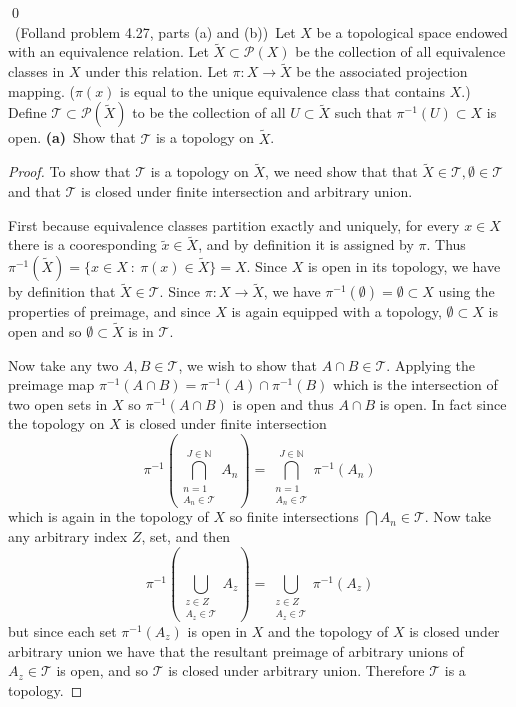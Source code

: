 \documentclass[11pt]{amsart}
\theoremstyle{definition}
\numberwithin{theorem}{section}
\numberwithin{definition}{section}
\numberwithin{equation}{section}
\def\scriptt{{\mathcal T}}
\def\scriptp{{\mathcal P}}
\begin{document}
\qed\\
\medskip {}\ (Folland problem 4.27, parts (a) and (b))\ 
Let $X$ be a topological space endowed with an equivalence relation.
Let $\tilde X\subset\scriptp(X)$ be the collection of all equivalence classes in $X$
under this relation.
Let $\pi:X\to\tilde X$ be the associated projection mapping. ($\pi(x)$ is equal to the
unique equivalence class that contains $X$.)
Define $\scriptt\subset\scriptp(\tilde X)$ to be the collection of
all $U\subset\tilde X$ such that $\pi^{-1}(U)\subset X$ is open.
{\bf (a)}\ 
Show that $\scriptt$ is a topology on $\tilde X$.
\begin{proof}
	To show that $\scriptt$ is a topology on $\tilde X$, we need show that that $\tilde X \in \scriptt, \emptyset \in \scriptt$ and that $\scriptt$ is closed under finite intersection and arbitrary union.

	First because equivalence classes partition exactly and uniquely, for every $x \in X$ there is a cooresponding $\tilde x \in \tilde X$, and by definition it is assigned by $\pi$. Thus $\pi^{-1}(\tilde X) = \{x \in X\ :\ \pi(x) \in \tilde X\} = X$. Since $X$ is open in its topology, we have by definition that $\tilde X \in \scriptt.$ Since $\pi: X \to \tilde X$, we have $\pi^{-1}(\emptyset) = \emptyset \subset X$ using the properties of preimage, and since $X$ is again equipped with a topology, $\emptyset \subset X$ is open and so $\emptyset \subset \tilde X$ is in $\scriptt.$

	Now take any two $A, B \in \scriptt$, we wish to show that $A \cap B \in \scriptt$. Applying the preimage map $\pi^{-1}(A \cap B) = \pi^{-1}(A) \cap \pi^{-1}(B)$ which is the intersection of two open sets in $X$ so $\pi^{-1}(A \cap B)$ is open and thus $A \cap B$ is open. In fact since the topology on $X$ is closed under finite intersection
	\begin{equation*}
		\pi^{-1}\left(\bigcap_{\substack{n=1 \\ A_n \in \scriptt}}^{J \in \mathbb{N}} A_n\right) = \bigcap_{\substack{n=1 \\ A_n \in \scriptt}}^{J \in \mathbb{N}} \pi^{-1}\left(A_n\right)
	\end{equation*}
	which is again in the topology of $X$ so finite intersections $\bigcap A_n \in \scriptt.$ Now take any arbitrary index $Z$, set, and then \begin{equation*}
		\pi^{-1}\left(\bigcup_{\substack{z \in Z\\ A_z \in \scriptt}} A_z\right) = \bigcup_{\substack{z \in Z\\ A_z \in \scriptt}}  \pi^{-1}\left(A_z\right)
	\end{equation*}
	but since each set $\pi^{-1}(A_z)$ is open in $X$ and the topology of $X$ is closed under arbitrary union we have that the resultant preimage of arbitrary unions of $A_z \in \scriptt$ is open, and so $\scriptt$ is closed under arbitrary union. Therefore $\scriptt$ is a topology.
\end{proof}
\end{document}

